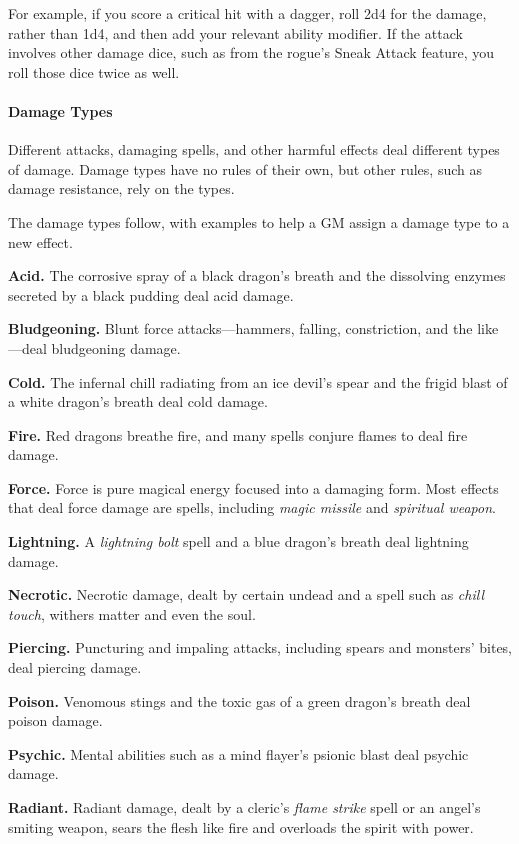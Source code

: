 \documentclass[
]{article}
\begin{document}
For example, if you score a critical hit with a dagger, roll 2d4 for the
damage, rather than 1d4, and then add your relevant ability modifier. If
the attack involves other damage dice, such as from the rogue's Sneak
Attack feature, you roll those dice twice as well.

\hypertarget{damage-types}{%
\paragraph{Damage Types}\label{damage-types}}

Different attacks, damaging spells, and other harmful effects deal
different types of damage. Damage types have no rules of their own, but
other rules, such as damage resistance, rely on the types.

The damage types follow, with examples to help a GM assign a damage type
to a new effect.

\textbf{Acid.} The corrosive spray of a black dragon's breath and the
dissolving enzymes secreted by a black pudding deal acid damage.

\textbf{Bludgeoning.} Blunt force attacks---hammers, falling,
constriction, and the like---deal bludgeoning damage.

\textbf{Cold.} The infernal chill radiating from an ice devil's spear
and the frigid blast of a white dragon's breath deal cold damage.

\textbf{Fire.} Red dragons breathe fire, and many spells conjure flames
to deal fire damage.

\textbf{Force.} Force is pure magical energy focused into a damaging
form. Most effects that deal force damage are spells, including
\emph{magic missile} and \emph{spiritual weapon}.

\textbf{Lightning.} A \emph{lightning bolt} spell and a blue dragon's
breath deal lightning damage.

\textbf{Necrotic.} Necrotic damage, dealt by certain undead and a spell
such as \emph{chill touch}, withers matter and even the soul.

\textbf{Piercing.} Puncturing and impaling attacks, including spears and
monsters' bites, deal piercing damage.

\textbf{Poison.} Venomous stings and the toxic gas of a green dragon's
breath deal poison damage.

\textbf{Psychic.} Mental abilities such as a mind flayer's psionic blast
deal psychic damage.

\textbf{Radiant.} Radiant damage, dealt by a cleric's \emph{flame
strike} spell or an angel's smiting weapon, sears the flesh like fire
and overloads the spirit with power.
\end{document}
